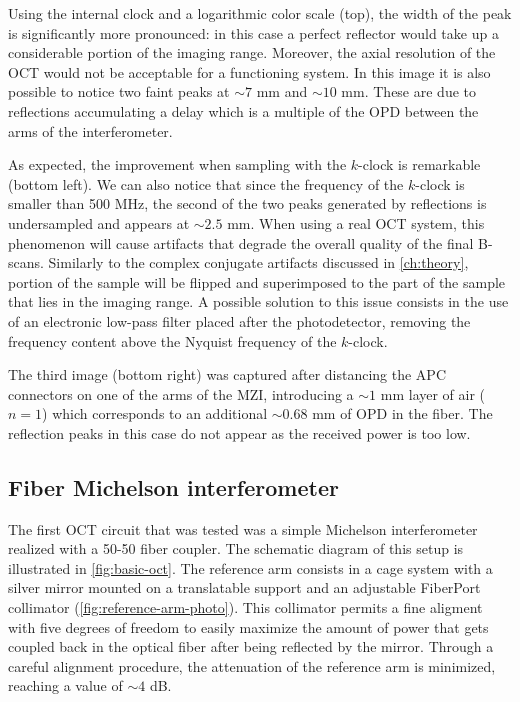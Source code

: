 Using the internal clock and a logarithmic color scale (top), the width of the peak is significantly more pronounced: in this case a perfect reflector would take up a considerable portion of the imaging range. Moreover, the axial resolution of the OCT would not be acceptable for a functioning system. In this image it is also possible to notice two faint peaks at $\sim 7$ mm and $\sim 10$ mm. These are due to reflections accumulating a delay which is a multiple of the OPD between the arms of the interferometer. 

As expected, the improvement when sampling with the $k$-clock is remarkable (bottom left). We can also notice that since the frequency of the $k$-clock is smaller than 500 MHz, the second of the two peaks generated by reflections is undersampled and appears at $\sim 2.5$ mm. 
When using a real OCT system, this phenomenon will cause artifacts that degrade the overall quality of the final B-scans. Similarly to the complex conjugate artifacts discussed in \autoref{ch:theory}, portion of the sample will be flipped and superimposed to the part of the sample that lies in the imaging range. A possible solution to this issue consists in the use of an electronic low-pass filter placed after the photodetector, removing the frequency content above the Nyquist frequency of the $k$-clock. 

The third image (bottom right) was captured after distancing the APC connectors on one of the arms of the \ac{MZI}, introducing a $\sim 1$ mm layer of air ($n=1$) which corresponds to an additional $\sim 0.68$ mm of OPD in the fiber. The reflection peaks in this case do not appear as the received power is too low. 


\subsection{Fiber Michelson interferometer}

The first OCT circuit that was tested was a simple Michelson interferometer realized with a 50-50 fiber coupler. The schematic diagram of this setup is illustrated in \autoref{fig:basic-oct}. The reference arm consists in a cage system with a silver mirror mounted on a translatable support and an adjustable FiberPort collimator (\autoref{fig:reference-arm-photo}). This collimator permits a fine aligment with five degrees of freedom to easily maximize the amount of power that gets coupled back in the optical fiber after being reflected by the mirror. Through a careful alignment procedure, the attenuation of the reference arm is minimized, reaching a value of $\sim 4$ dB. 


